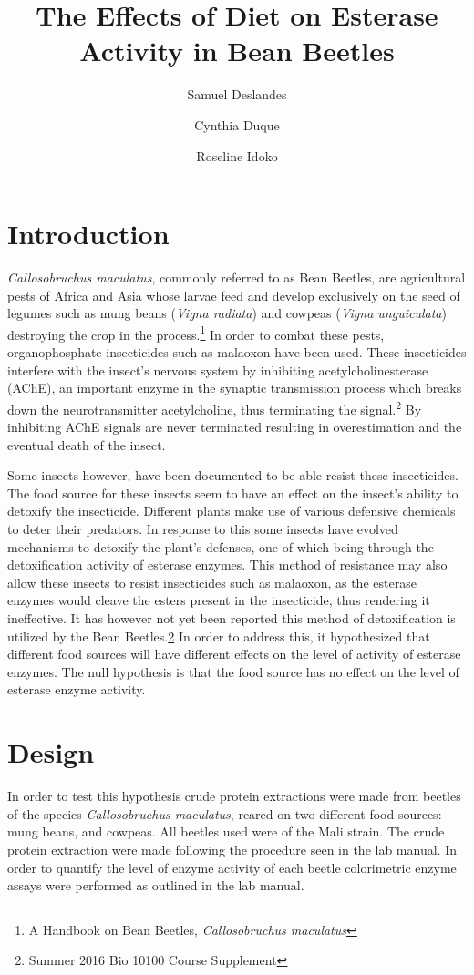 \documentclass[12pt]{article}
\title{The Effects of Diet on Esterase Activity in Bean Beetles}
\author{Samuel Deslandes \and Cynthia Duque \and Roseline Idoko}
\date{}
\begin{document}
\maketitle


\doublespacing

\section{Introduction} 
	\textit{Callosobruchus maculatus}, commonly referred to as Bean Beetles, are agricultural pests of Africa and Asia whose larvae feed and develop exclusively on the seed of legumes such as mung beans (\textit{Vigna radiata}) and cowpeas (\textit{Vigna unguiculata}) destroying the crop in the process.\footnote{\label{Handbook}A Handbook on Bean Beetles, \textit{Callosobruchus maculatus}} In order to combat these pests, organophosphate insecticides such as malaoxon have been used. These insecticides interfere with the insect's nervous system by inhibiting acetylcholinesterase (AChE), an important enzyme in the synaptic transmission process which breaks down the neurotransmitter acetylcholine, thus terminating the signal.\footnote{\label{manual}Summer 2016 Bio 10100 Course Supplement} By inhibiting AChE signals are never terminated resulting in overestimation and the eventual death of the insect. 
	
	Some insects however, have been documented to be able resist these insecticides. The food source for these insects seem to have an effect on the insect's ability to detoxify the insecticide. Different plants make use of various defensive chemicals to deter their predators. In response to this some insects have evolved mechanisms to detoxify the plant's defenses, one of which being through the detoxification activity of esterase enzymes. This method of resistance may also allow these insects to resist insecticides such as malaoxon, as the esterase enzymes would cleave the esters present in the insecticide, thus rendering it ineffective. It has however not yet been reported this method of detoxification is utilized by the Bean Beetles.\cref{manual} In order to address this, it hypothesized that different food sources will have different effects on the level of activity of esterase enzymes. The null hypothesis is that the food source has no effect on the level of esterase enzyme activity. 
	
\section{Design}
	In order to test this hypothesis crude protein extractions were made from beetles of the species \textit{Callosobruchus maculatus}, reared on two different food sources: mung beans, and cowpeas. All beetles used were of the Mali strain. The crude protein extraction were made following the procedure seen in the lab manual. In order to quantify the level of enzyme activity of each beetle colorimetric enzyme assays were performed as outlined in the lab manual. 
\end{document}
